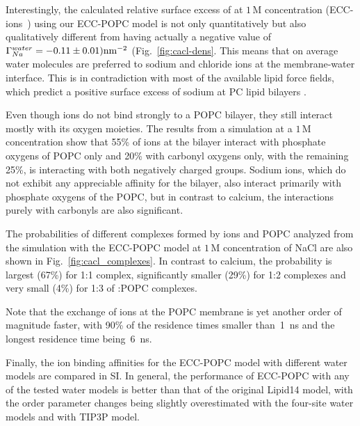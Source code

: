 Interestingly, the calculated relative surface excess of  at $1\,\mathrm{M}$ concentration (ECC-ions~\citep{Pluharova2014}) using our ECC-POPC model is not only quantitatively but also qualitatively different from  having actually a negative value of $\Gamma_{Na}^{water} = -0.11 \pm 0.01) \rm{nm}^{-2}$ (Fig.~\ref{fig:cacl-dens}. This  
means that on average water molecules are preferred to sodium and chloride ions at the membrane-water interface.   
This is in contradiction with most of the available lipid force fields, which predict a positive surface excess of sodium at PC lipid bilayers \citep{catte16}. 
 
Even though  ions do not bind strongly to a POPC bilayer, they still interact mostly with its oxygen moieties. 
The results from a simulation at a $1\,$M  concentration show that 55\% of  ions at the bilayer interact with phosphate oxygens of POPC only and 20\% with carbonyl oxygens only, with the remaining 25\%, is interacting with both negatively charged groups. 
Sodium ions, which do not exhibit any appreciable affinity for the bilayer, also interact primarily with phosphate oxygens of the POPC, but in contrast to calcium, the interactions purely with carbonyls are also significant. 
 
The probabilities of different complexes formed by  ions and POPC 
analyzed from the simulation with the ECC-POPC model at $1\,$M concentration of NaCl are also  
shown in Fig.~\ref{fig:cacl_complexes}. In contrast to calcium, the 
probability is largest (67\%) for 1:1 complex, significantly smaller (29\%) 
for 1:2 complexes and very small (4\%) for 1:3 of :POPC complexes. 
 
Note that the exchange of  ions at the POPC membrane 
is yet another order of magnitude faster, with 90\% of the residence times smaller than~1~ns and the longest residence time being~6~ns. 
 
Finally, the ion binding affinities for the ECC-POPC model with different water models are compared in SI. In general, the performance of ECC-POPC with any of the tested water models is better than that of the original Lipid14 model, with the order parameter changes being slightly overestimated with the four-site water models and with TIP3P model. 
 




